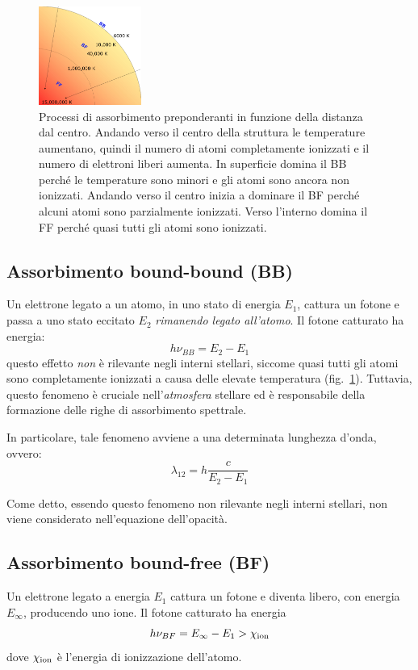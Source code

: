 \begin{figure}
\centering
\includegraphics[width=0.3\textwidth]{immagini/assorbimenti-stella.png}
\caption{Processi di assorbimento preponderanti in funzione della distanza dal centro. Andando verso il centro della struttura le temperature aumentano, quindi il numero di atomi completamente ionizzati e il numero di elettroni liberi aumenta. In superficie domina il BB perché le temperature sono minori e gli atomi sono ancora non ionizzati. Andando verso il centro inizia a dominare il BF perché alcuni atomi sono parzialmente ionizzati. Verso l'interno domina il FF perché quasi tutti gli atomi sono ionizzati.}
\label{fig:assorbimenti-stella}
\end{figure}

\subsection{Assorbimento bound-bound (BB)}\label{sec:bound-bound}
Un elettrone legato a un atomo, in uno stato di energia $E_1$, cattura un fotone e passa a uno stato eccitato $E_2$ \emph{rimanendo legato all'atomo}. Il fotone catturato ha energia:
\begin{equation}
    h \nu_{BB} = E_2 - E_1
\end{equation}
questo effetto \emph{non} è rilevante negli interni stellari, siccome quasi tutti gli atomi sono completamente ionizzati a causa delle elevate temperatura (fig.~\ref{fig:assorbimenti-stella}). Tuttavia, questo fenomeno è cruciale nell'\emph{atmosfera} stellare ed è responsabile della formazione delle righe di assorbimento spettrale.

In particolare, tale fenomeno avviene a una determinata lunghezza d'onda, ovvero:
\begin{equation}\label{eq:lunghezza-BB}
    \lambda_{12} = h \dfrac{c}{E_2 - E_1}
\end{equation}

Come detto, essendo questo fenomeno non rilevante negli interni stellari, non viene considerato nell'equazione dell'opacità.

\subsection{Assorbimento bound-free (BF)}\label{sec:bound-free}
Un elettrone legato a energia $E_1$ cattura un fotone e diventa libero, con energia $E_\infty$, producendo uno ione. Il fotone catturato ha energia
\begin{equation}
    h \nu_{BF} = E_\infty - E_1 > \chi_\textup{ion}
\end{equation}
dove $\chi_\textup{ion}$ è l'energia di ionizzazione dell'atomo. 

